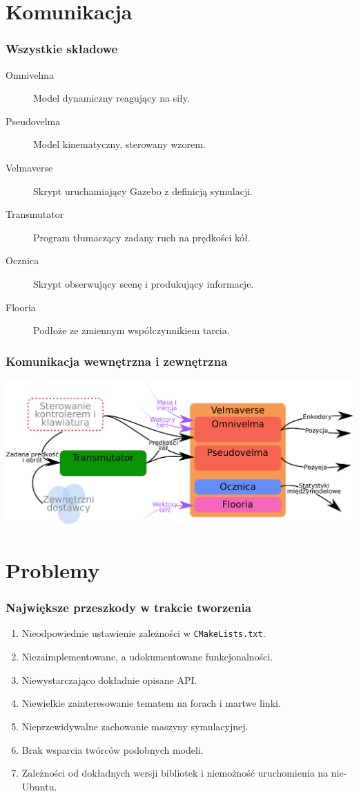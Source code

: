 \documentclass{beamer}
\begin{document}
	\section{Komunikacja}
	\begin{frame}
		\frametitle{Wszystkie składowe}
		\begin{description}
			\item[Omnivelma] Model dynamiczny reagujący na siły.
			\item[Pseudovelma] Model kinematyczny, sterowany wzorem.
			\item[Velmaverse] Skrypt uruchamiający Gazebo z definicją symulacji.
			\item[Transmutator] Program tłumaczący zadany ruch na prędkości kół.
			\item[Ocznica] Skrypt obserwujący scenę i produkujący informacje.
			\item[Flooria] Podłoże ze zmiennym współczynnikiem tarcia.
		\end{description}
	\end{frame}
	\begin{frame}
		\frametitle{Komunikacja wewnętrzna i zewnętrzna}
		\centering
		\includegraphics[width=\textwidth]{graphics/comm.pdf}
	\end{frame}
	
	\section{Problemy}
	\begin{frame}
		\frametitle{Największe przeszkody w trakcie tworzenia}
		\begin{enumerate}
			\item Nieodpowiednie ustawienie zależności w \texttt{CMakeLists.txt}.
			\item Niezaimplementowane, a udokumentowane funkcjonalności.
			\item Niewystarczająco dokładnie opisane API.
			\item Niewielkie zainteresowanie tematem na forach i martwe linki.
			\item Nieprzewidywalne zachowanie maszyny symulacyjnej.
			\item Brak wsparcia twórców podobnych modeli.
			\item Zależności od dokładnych wersji bibliotek i niemożność uruchomienia na nie-Ubuntu.
		\end{enumerate}
	\end{frame}
 
\end{document}
